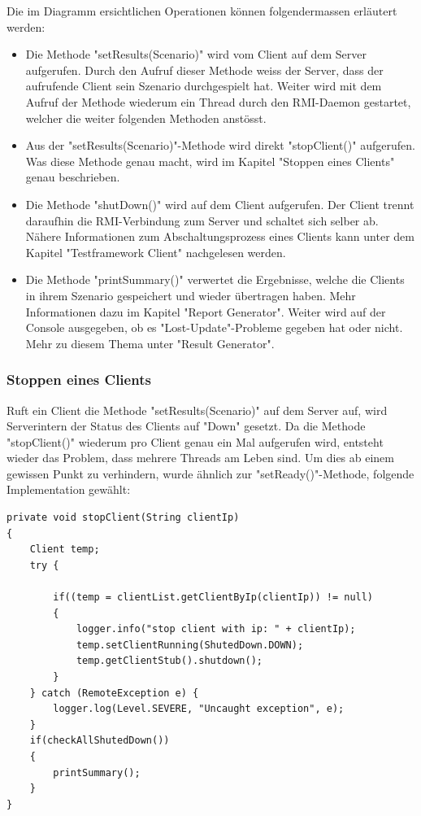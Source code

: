 Die im Diagramm ersichtlichen Operationen können folgendermassen erläutert werden:
\begin{itemize}
\item Die Methode "setResults(Scenario)" wird vom Client auf dem Server aufgerufen. Durch den Aufruf dieser Methode weiss der Server, dass der aufrufende Client sein Szenario durchgespielt hat. Weiter wird mit dem Aufruf der Methode wiederum ein Thread durch den RMI-Daemon gestartet, welcher die weiter folgenden Methoden anstösst.
\item Aus der "setResults(Scenario)"-Methode wird direkt "stopClient()" aufgerufen. Was diese Methode genau macht, wird im Kapitel "Stoppen eines Clients" genau beschrieben.
\item Die Methode "shutDown()" wird auf dem Client aufgerufen. Der Client trennt daraufhin die RMI-Verbindung zum Server und schaltet sich selber ab. Nähere Informationen zum Abschaltungsprozess eines Clients kann unter dem Kapitel "Testframework Client" nachgelesen werden.
\item Die Methode "printSummary()" verwertet die Ergebnisse, welche die Clients in ihrem Szenario gespeichert und wieder übertragen haben. Mehr Informationen dazu im Kapitel "Report Generator". Weiter wird auf der Console ausgegeben, ob es "Lost-Update"-Probleme gegeben hat oder nicht. Mehr zu diesem Thema unter "Result Generator".
\end{itemize}

\subsubsection{Stoppen eines Clients}
\label{sec:stopClient}
Ruft ein Client die Methode "setResults(Scenario)" auf dem Server auf, wird Serverintern der Status des Clients auf "Down" gesetzt. Da die Methode "stopClient()" wiederum pro Client genau ein Mal aufgerufen wird, entsteht wieder das Problem, dass mehrere Threads am Leben sind. Um dies ab einem gewissen Punkt zu verhindern, wurde ähnlich zur "setReady()"-Methode, folgende Implementation gewählt:
\begin{lstlisting}
private void stopClient(String clientIp)
{
	Client temp;
	try {
		
		if((temp = clientList.getClientByIp(clientIp)) != null)
		{
			logger.info("stop client with ip: " + clientIp);
			temp.setClientRunning(ShutedDown.DOWN);
			temp.getClientStub().shutdown();
		}
	} catch (RemoteException e) {
		logger.log(Level.SEVERE, "Uncaught exception", e);
	}
	if(checkAllShutedDown())
	{
		printSummary();
	}
}
\end{lstlisting}

